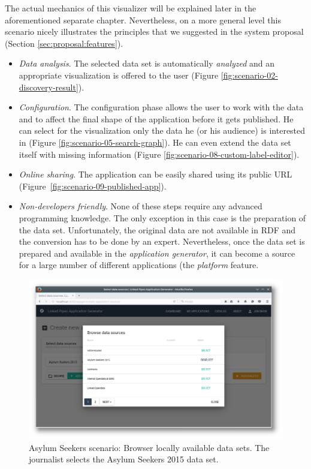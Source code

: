 The actual mechanics of this visualizer will be explained later in the aforementioned separate chapter. Nevertheless, on a more general level this scenario nicely illustrates the principles that we suggested in the system proposal (Section \ref{sec:proposal:features}). 

\begin{itemize}
\item \emph{Data analysis}. The selected data set is automatically \emph{analyzed} and an appropriate visualization is offered to the user (Figure \ref{fig:scenario-02-discovery-result}).
\item \emph{Configuration}. The configuration phase allows the user to work with the data and to affect the final shape of the application before it gets published.  He can select for the visualization only the data he (or his audience) is interested in (Figure \ref{fig:scenario-05-search-graph}). He can even extend the data set itself with missing information (Figure \ref{fig:scenario-08-custom-label-editor}). 
\item \emph{Online sharing}. The application can be easily shared using its public URL (Figure~\ref{fig:scenario-09-published-app}).
\item \emph{Non-developers friendly}. None of these steps require any advanced programming knowledge. The only exception in this case is the preparation of the data set. Unfortunately, the original data are not available in RDF and the conversion has to be done by an expert. Nevertheless, once the data set is prepared and available in the \emph{application generator}, it can become a source for a large number of different applications (the \emph{platform} feature.
\end{itemize}
\begin{figure}
	\centering
	\includegraphics[width=145mm]{img/05_scenario_01_browse_data_sources.png}
	\caption{Asylum Seekers scenario: Browser locally available data sets. The journalist selects the Asylum Seekers 2015 data set.}
	\label{fig:scenario-01-browse-data-sources}
\end{figure}
